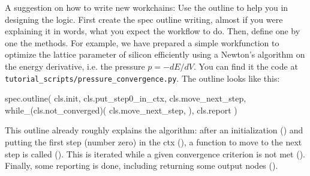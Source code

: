 A suggestion on how to write new workchains: Use the outline to help you in designing the logic. First create the spec outline writing, almost if you were explaining it in words, what you expect the workflow to do. Then, define one by one the methods.
For example, we have prepared a simple workfunction to optimize the lattice parameter of silicon efficiently using a Newton's algorithm on the energy derivative, i.e. the pressure $p=-dE/dV$. You can find it the code at \texttt{tutorial\_scripts/pressure\_convergence.py}. 
The outline looks like this:
\begin{pythoncommand}
spec.outline(
    cls.init,
    cls.put_step0_in_ctx,
    cls.move_next_step,
    while_(cls.not_converged)(
        cls.move_next_step,
     ),
    cls.report
)
\end{pythoncommand}
This outline already roughly explains the algorithm: after an initialization () and putting the first step (number zero) in the ctx (), a function to move to the next step is called (). This is iterated while a given convergence criterion is not met (). Finally, some reporting is done, including returning some output nodes ().

